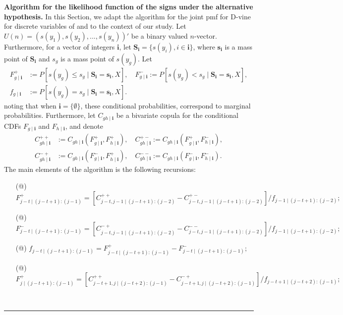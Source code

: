 \documentclass[harvard,11pt]{article}
\makeatletter
\newcommand*{\rom}[1]{\expandafter\@slowromancap\romannumeral #1@}
\newenvironment{proof}[1][Proof]{\textbf{#1.} }{\  \rule{0.5em}{0.5em}}
\makeatother
\begin{document}
\begin{proof}[Algorithm for the likelihood function of the signs under the alternative hypothesis]
In this Section, we adapt the algorithm for the joint pmf for D-vine for discrete variables of \citet{panagiotelis2012pair} and \citet{joe2014dependence} to the context of our study. Let $U(n)=\left(s(y_1),s(y_2),...,s(y_n)\right)'$ be a binary valued $n$-vector. Furthermore, for a vector of integers $\mathbf{i}$, let $\mathbf{S_{i}}=\{s(y_i), i\in \mathbf{i}\}$, where $\mathbf{s_i}$ is a mass point of $\mathbf{S_i}$ and $s_g$ is a mass point of $s(y_g)$. Let
\begingroup
\allowdisplaybreaks
\begin{align*}
F_{g\mid \mathbf{i}}^{+}&:=P\left[s(y_g)\leq s_g\mid \mathbf{S_i}=\mathbf{s_i},X\right],\quad F_{g\mid \mathbf{i}}^{-}:=P\left[s(y_g)< s_g\mid \mathbf{S_i}=\mathbf{s_i},X\right],\\
f_{g\mid \mathbf{i}}&:=P[s(y_g)=s_g\mid\mathbf{S_i}=\mathbf{s_i},X].
\end{align*}
 \endgroup 
noting that when $\mathbf{i}=\{\emptyset\}$, these conditional probabilities, correspond to marginal probabilities. Furthermore, let  $C_{gh\mid\mathbf{i}}$ be a bivariate copula for the conditional CDFs $F_{g\mid\mathbf{i}}$ and $F_{h\mid\mathbf{i}}$, and denote
\begingroup
\allowdisplaybreaks
\begin{align*}
C^{++}_{gh\mid\mathbf{i}}&:=C_{gh\mid\mathbf{i}}\left(F_{g\mid\mathbf{i}}^+,F_{h\mid\mathbf{i}}^+\right),\quad C^{+-}_{gh\mid\mathbf{i}}:=C_{gh\mid\mathbf{i}}\left(F_{g\mid\mathbf{i}}^+,F_{h\mid\mathbf{i}}^-\right),\\
C^{-+}_{gh\mid\mathbf{i}}&:=C_{gh\mid\mathbf{i}}\left(F_{g\mid\mathbf{i}}^-,F_{h\mid\mathbf{i}}^+\right),\quad C^{--}_{gh\mid\mathbf{i}}:=C_{gh\mid\mathbf{i}}\left(F_{g\mid\mathbf{i}}^-,F_{h\mid\mathbf{i}}^-\right).
\end{align*}
\endgroup
The main elements of the algorithm is the following recursions:
\begin{itemize}
\item[(\rom{1})] $F_{j-t\mid (j-t+1):(j-1)}^+=\left[C_{j-t,j-1\mid(j-t+1):(j-2)}^{++}-C_{j-t,j-1\mid(j-t+1):(j-2)}^{+-}\right]/f_{j-1\mid(j-t+1):(j-2)};$ 
\item[(\rom{2})] $F_{j-t\mid (j-t+1):(j-1)}^-=\left[C_{j-t,j-1\mid(j-t+1):(j-2)}^{-+}-C_{j-t,j-1\mid(j-t+1):(j-2)}^{--}\right]/f_{j-1\mid(j-t+1):(j-2)};$
\item[(\rom{3})] $f_{j-t\mid (j-t+1):(j-1)}=F_{j-t\mid (j-t+1):(j-1)}^+-F_{j-t\mid (j-t+1):(j-1)}^-;$
\item[(\rom{4})] $F_{j\mid (j-t+1):(j-1)}^+=\left[C_{j-t+1,j\mid(j-t+2):(j-1)}^{++}-C_{j-t+1,j\mid(j-t+2):(j-1)}^{-+}\right]/f_{j-t+1\mid(j-t+2):(j-1)};$

\end{itemize}
\end{proof}
\end{document}
